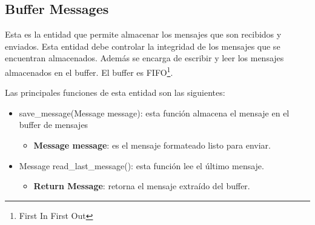 \subsection{Buffer Messages}
Esta es la entidad que permite almacenar los mensajes que son recibidos y
enviados. Esta entidad debe controlar la integridad de los mensajes que se
encuentran almacenados. Además se encarga de escribir y leer los mensajes
almacenados en el buffer. El buffer es FIFO\footnote{First In First Out}.

Las principales funciones de esta entidad son las siguientes:
\begin{itemize}
\item save\_message(Message message): esta función almacena el mensaje en
  el buffer de mensajes
  \begin{itemize}
  \item \textbf{Message message}: es el mensaje formateado listo para enviar.
  \end{itemize}
  
\item Message read\_last\_message(): esta función lee el último mensaje.
  \begin{itemize}
    \item \textbf{Return Message}: retorna el mensaje extraído del buffer.
  \end{itemize}
  
\end{itemize}






